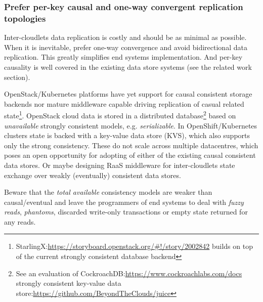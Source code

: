\documentclass[conference]{IEEEtran}
\begin{document}
\subsubsection{Prefer per-key causal and one-way convergent replication topologies}
Inter-cloudlets data replication is costly and should be as minimal as possible.
When it is inevitable, prefer one-way convergence\cite{b2} and avoid bidirectional
data replication. This greatly simplifies end systems implementation. And
per-key causality is well covered in the existing data store systems (see the
related work section).

OpenStack/Kubernetes platforms have yet support for causal consistent storage
backends nor mature middleware capable driving replication of casual related
state\footnote{StarlingX:\url{https://storyboard.openstack.org/#!/story/2002842}
builds on top of the current strongly consistent database backend}. OpenStack
cloud data is stored in a distributed database\footnote{See an evaluation of
CockroachDB:\url{https://www.cockroachlabs.com/docs} strongly consistent
key-value data store:\url{https://github.com/BeyondTheClouds/juice}} based on
\textit{unavailable}\cite{b4} strongly consistent models, e.g.
\textit{serializable}\cite{b4}. In OpenShift/Kubernetes clusters state is
backed with a key-value data store (KVS), which also supports only the strong
consistency. These do not scale across multiple datacentres, which poses an
open opportunity for adopting of either of the existing causal consistent data
stores. Or maybe designing RaaS middleware for inter-cloudlets state exchange
over weakly (eventually) consistent data stores.

Beware that the \textit{total available}\cite{b4} consistency models are
weaker than causal/eventual and leave the programmers of end systems to deal
with \textit{fuzzy reads}\cite{b4}, \textit{phantoms}\cite{b4}, discarded
write-only transactions or empty state returned for any reads.
\end{document}
